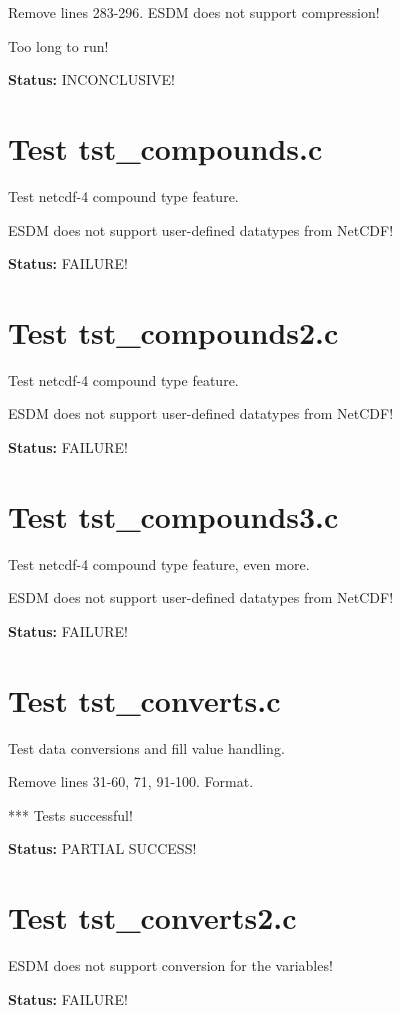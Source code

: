 Remove lines 283-296. ESDM does not support compression!

Too long to run!

{\bf \large Status: } INCONCLUSIVE!

\section{Test tst\_compounds.c}

Test netcdf-4 compound type feature.

ESDM does not support user-defined datatypes from NetCDF!

{\bf \large Status: } FAILURE!

\section{Test tst\_compounds2.c}

Test netcdf-4 compound type feature.

ESDM does not support user-defined datatypes from NetCDF!

{\bf \large Status: } FAILURE!

\section{Test tst\_compounds3.c}

Test netcdf-4 compound type feature, even more.

ESDM does not support user-defined datatypes from NetCDF!

{\bf \large Status: } FAILURE!

\section{Test tst\_converts.c}

Test data conversions and fill value handling.

Remove lines 31-60, 71, 91-100. Format.

*** Tests successful!

{\bf \large Status: } PARTIAL SUCCESS!

\section{Test tst\_converts2.c}

ESDM does not support conversion for the variables!

{\bf \large Status: } FAILURE!


